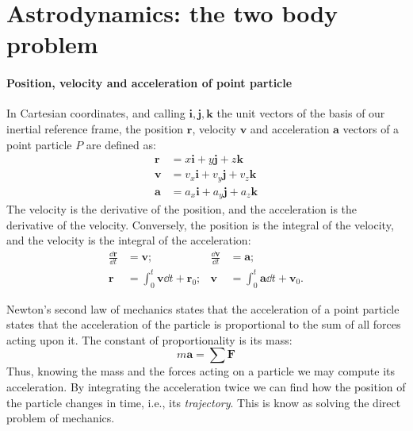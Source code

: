 \section[Astrodynamics]{Astrodynamics: the two body problem}

\paragraph{Position, velocity and acceleration of point particle}

In Cartesian coordinates, and calling $\bm i,\bm j, \bm k$ the unit vectors
of the basis of our inertial reference frame, the position $\bm r$, velocity 
$\bm v$ and acceleration $\bm a$ vectors of a point particle $P$ are defined 
as:
%
\begin{align}
\bm r &= x\bm i + y \bm j + z \bm k
\\
\bm v &= v_x\bm i + v_y \bm j + v_z \bm k
\\
\bm a &= a_x\bm i + a_y \bm j + a_z \bm k
\end{align}
%
The velocity is the derivative of the position, and the acceleration is the 
derivative of the velocity. Conversely, the position is the integral of the 
velocity, and the velocity is the integral of the acceleration:
%
\begin{align}
\frac{\dd \bm r}{\dd t} &= \bm v;
&\frac{\dd \bm v}{\dd t} &= \bm a;
\\
\bm r &= \int_0^t \bm v \dd t + \bm r_0;
&\bm v &= \int_0^t \bm a \dd t + \bm v_0.
\end{align}
%

Newton's second law of mechanics states that the acceleration of a point 
particle states that the acceleration of the particle is proportional to the 
sum of all forces acting upon it. The constant of proportionality is its mass:
%
\begin{equation}
m\bm a = \sum \bm F
\end{equation}
%
Thus, knowing the mass and the forces acting on a particle we may compute its 
acceleration. By integrating the acceleration twice we can find how the 
position of the particle changes in time, i.e., its \emph{trajectory}. This
is know as solving the direct problem of mechanics.

